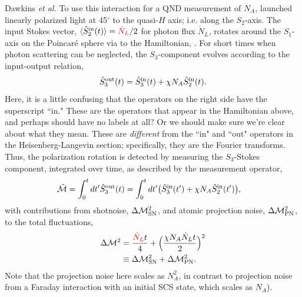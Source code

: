 \documentclass[preprint,aps,pra,onecolumn]{revtex4-1} %
\newcommand{\change}[1]{{\color{RoyalBlue} #1}}
\newcommand{\comment}[1]{{\color{Maroon} #1}}
\newcommand{\error}[1]{{\color{red} #1}}
\begin{document}
\change{Dawkins {\em et al.} To use this interaction for a QND measurement of $N_A$, launched linearly polarized light at 45$^\circ$ to the quasi-$H$ axis; i.e. along the $S_2$-axis.  The input Stokes vector, $\langle \hat{S}_2^{\rm in}(t)\rangle  = \error{\dot{N}_L}/2$ for photon flux $\dot{N}_L$, rotates around the $S_1$-axis on the Poincar\'{e} sphere via to the Hamiltonian, \erf{Eq::MixedHamiltonian}.  For short times when photon scattering can be neglected, the $S_3$-component evolves according to the input-output relation,
\change{
\begin{equation}
\hat{S}_3^{\rm out}(t) = \hat{S}_3^{\rm in}(t) + \chi N_A \hat{S}_2^{\rm in}(t).
\end{equation}
}
\comment{Here, it is a little confusing that the operators on the right side have the superscript ``in."  These are the operators that appear in the Hamiltonian above, and perhaps should have no labels at all?  Or we should make sure we're clear about what they mean.  These are \emph{different} from the ``in" and ``out" operators in the Heisenberg-Langevin section; specifically, they are the Fourier transforms.  } Thus, the polarization rotation is detected by measuring the $S_3$-Stokes component, integrated over time, as described by the measurement operator,
	\begin{align}
		\hat{\mathcal{M}} &= \int_0^t dt' \hat{S}_3^{\rm out}(t) = \int_0^t dt' \big(\hat{S}_3^{\rm in}(t') + \chi N_A \hat{S}_2^{\rm in}(t') \big),
	\end{align}
with contributions from shotnoise, $\Delta \mathcal{M}_{\rm SN}^2$, and atomic projection noise, $\Delta \mathcal{M}_{\rm PN}^2$, to the total fluctuations,
	\begin{align}
		\Delta \mathcal{M}^2 &= \frac{ \error{\dot{N}_L} t}{4} +  \Big( \frac{\chi N_A \dot{N}_L t}{2} \Big)^2 \label{Eq::MeasurementVariance}\\
			&\equiv \Delta \mathcal{M}_{\rm SN}^2 + \Delta \mathcal{M}_{\rm PN}^2.
	\end{align}
\comment{Note that the projection noise here scales as $N_A^2$, in contrast to projection noise from a Faraday interaction with an initial SCS state, which scales as $N_A$). }

}
\end{document}

